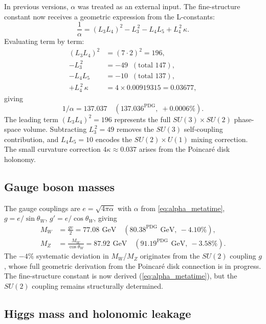 \documentclass[aps,prd,reprint,twocolumn,showpacs,superscriptaddress]{revtex4-2}
\newcommand{\gev}{\,\text{GeV}}
\newcommand{\PDG}[1]{\ensuremath{#1^{\text{PDG}}}}
\begin{document}
In previous versions, $\alpha$ was treated as an external input.
The fine-structure constant now receives a geometric expression
from the L-constants:
\begin{equation}
\frac{1}{\alpha} = (L_3 L_4)^2 - L_3^{\,2} - L_4 L_5 + L_4^{\,2}\,\kappa.
\label{eq:alpha_metatime}
\end{equation}
Evaluating term by term:
\begin{align}
(L_3 L_4)^2 &= (7\cdot2)^2 = 196, \\
- L_3^{\,2} &= -49 \;\; (\text{total } 147), \\
- L_4 L_5 &= -10 \;\; (\text{total } 137), \\
+ L_4^{\,2}\,\kappa &= 4 \times 0.00919315 = 0.03677,
\end{align}
giving
\begin{equation}
1/\alpha = 137.037 \quad (\PDG{137.036},\; +0.0006\%).
\label{eq:alpha_value}
\end{equation}
The leading term $(L_3 L_4)^2 = 196$ represents the full
$SU(3)\times SU(2)$ phase-space volume.  Subtracting $L_3^{\,2}=49$
removes the $SU(3)$ self-coupling contribution, and
$L_4 L_5 = 10$ encodes the $SU(2)\times U(1)$ mixing correction.
The small curvature correction $4\kappa \approx 0.037$ arises
from the Poincar\'{e} disk holonomy.

\subsection{Gauge boson masses}

The gauge couplings are $e = \sqrt{4\pi\alpha}$ with
$\alpha$ from \eqref{eq:alpha_metatime}, $g = e/\sin\theta_W$,
$g' = e/\cos\theta_W$, giving
\begin{align}
M_W &= \frac{gv}{2} = 77.08\ \gev
     \quad (\PDG{80.38}\ \gev,\ -4.10\%), \\
M_Z &= \frac{M_W}{\cos\theta_W} = 87.92\ \gev
     \quad (\PDG{91.19}\ \gev,\ -3.58\%).
\end{align}
The $-4\%$ systematic deviation in $M_W$/$M_Z$ originates from the
$SU(2)$ coupling $g$, whose full geometric derivation from the
Poincar\'{e} disk connection is in progress.  The fine-structure
constant is now derived (\eqref{eq:alpha_metatime}), but the
$SU(2)$ coupling remains structurally determined.

\subsection{Higgs mass and holonomic leakage}
\end{document}
